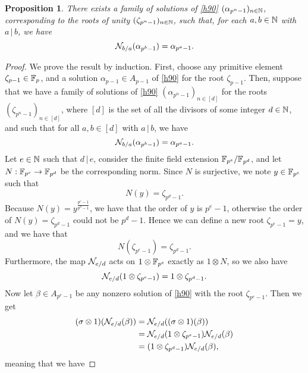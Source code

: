 \documentclass{sig-alternate}
\newtheorem{proposition}[theorem]{Proposition}
\begin{document}
\begin{proposition}
  \label{prop:complete-alg}
  There exists a family of solutions of \eqref{h90}
  $(\alpha_{p^n-1})_{n\in\mathbb{N}}$, corresponding to the roots of unity
  $(\zeta_{p^n-1})_{n\in\mathbb{N}}$, such that, for each $a,b\in\mathbb{N}$
  with $a\,|\,b$, we have
  \[
    \mathcal{N}_{b/a}(\alpha_{p^b-1})=\alpha_{p^a-1}.
  \]
\end{proposition}
\begin{proof}


  We prove the result by induction. First, choose any primitive element
  $\zeta_{p-1}\in\mathbb{F}_{p}$, and a solution $\alpha_{p-1}\in
  A_{p-1}$ of \eqref{h90} for the root $\zeta_{p-1}$. Then, suppose that we have
  a family of solutions of \eqref{h90} $(\alpha_{p^n-1})_{n\in \left[ d
  \right]}$ for the roots
  $(\zeta_{p^n-1})_{n\in \left[ d \right]}$, where $\left[ d \right]$ is
  the set of all the divisors of some integer $d\in\mathbb{N}$, and such that for all $a,
  b\in \left[ d \right]$ with $a\,|\,b$, we have
  \[
    \mathcal{N}_{b/a}(\alpha_{p^b-1})=\alpha_{p^a-1}.
  \]
  Let $e\in\mathbb{N}$ such that $d\,|\,e$, consider the
  finite field extension $\mathbb{F}_{p^{e}}/\mathbb{F}_{p^{d}}$, and
  let $N:\mathbb{F}_{p^{e}}\to\mathbb{F}_{p^{d}}$ be the corresponding
  norm. Since $N$ is surjective, we note $y\in\mathbb{F}_{p^{e}}$ such
  that
  \[
    N(y) = \zeta_{p^{d}-1}.
  \]
  Because $N(y)=y^{\frac{p^{e}-1}{p^{d}-1}}$, we have that the order of
  $y$ is $p^{e}-1$, otherwise the order of $N(y)=\zeta_{p^{d}-1}$ could not
  be $p^{d}-1$. Hence we can define a new root $\zeta_{p^{e}-1}=y$, and we
  have that
  \[
    N(\zeta_{p^{e}-1})=\zeta_{p^{d}-1}.
  \]
  Furthermore, the map $\mathcal{N}_{e/d}$ acts on
  $1\otimes\mathbb{F}_{p^{e}}$ exactly as $1\otimes N$, so we also have
  \[
    \mathcal{N}_{e/d}(1\otimes\zeta_{p^{e}-1}) = 1\otimes\zeta_{p^{d}-1}.
  \]
Now let
$\beta\in A_{p^{e}-1}$ be any nonzero solution of \eqref{h90} with the root
$\zeta_{p^{e}-1}$.
Then we get
\begin{align*}
  (\sigma\otimes1)(\mathcal{N}_{e/d}(\beta)) &= \mathcal{N}_{e/d}((\sigma\otimes1)(\beta)) \\
  &= \mathcal{N}_{e/d}(1\otimes\zeta_{p^{e}-1}) \mathcal{N}_{e/d}(\beta) \\
  &= (1\otimes\zeta_{p^{d}-1})\mathcal{N}_{e/d}(\beta),
\end{align*}
meaning that we have

\end{proof}
\end{document}
